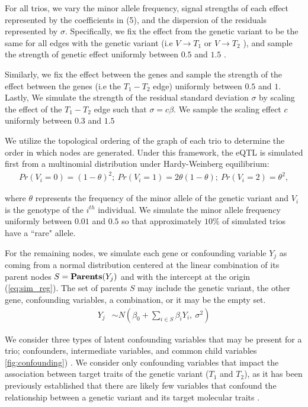 \documentclass[12pt,letterpaper]{report}
\begin{document}
\begin{doublespace}
For all trios, we vary the minor allele frequency, signal strengths of each effect represented by the coefficients in (5), and the dispersion of the residuals represented by $\sigma$. Specifically, we fix the effect from the genetic variant to be the same for all edges with the genetic variant (i.e $V \rightarrow T_1$ or $V \rightarrow T_2$ ), and sample the strength of genetic effect uniformly between $0.5$ and $1.5$ \cite{yang2017identifying}. 

Similarly, we fix the effect between the genes and sample the strength of the effect between the genes (i.e the $T_1 - T_2$ edge) uniformly between $0.5$ and $1$. Lastly, We simulate the strength of the residual standard deviation $\sigma$ by scaling the effect of the $T_1 - T_2$ edge such that $\sigma = c\beta$. We sample the scaling effect $c$ uniformly between $0.3$ and $1.5$

We utilize the topological ordering of the graph of each trio to determine the order in which nodes are generated. Under this framework, the eQTL is simulated first from a multinomial distribution under Hardy-Weinberg equilibrium:
%
\begin{align}
	Pr(V_i = 0 ) = (1-\theta)^2; \ Pr( V_i = 1) =2\theta(1-\theta); \ Pr(V_i = 2) = \theta^2, \label{eq:snpsim}
\end{align}

\hspace{-5pt}where $\theta$ represents the frequency of the minor allele of the genetic variant and $V_i$ is the genotype of the $i^{th}$ individual. We simulate the minor allele frequency uniformly between $0.01$ and $0.5$ so that approximately $10\%$ of simulated trios have a ``rare" allele.  

For the remaining nodes, we simulate each gene or confounding variable $Y_j$ as coming from a normal distribution centered at the linear combination of its parent nodes $S = {\bf Parents}(Y_j)$ and with the intercept at the origin (\autoref{eq:sim_reg}). The set of parents $S$ may include the genetic variant, the other gene, confounding variables, a combination, or it may be the empty set. 
\begin{align}
	Y_j &\sim N\left( \beta_0 + \sum_{i\in S} \beta_{i} Y_i, \ \sigma^2 \right) \label{eq:sim_reg}
\end{align} 

We consider three types of latent confounding variables that may be present for a trio; confounders, intermediate variables, and common child variables \autoref{fig:confounding}) \cite{yang2017identifying}. We consider only confounding variables that impact the association between target traits of the genetic variant ($T_1$ and $T_2$), as it has been previously established that there are likely few variables that confound the relationship between a genetic variant and its target molecular traits \cite{davey2014mendelian, burgess2018inferring}. 



\end{doublespace}
\end{document}
